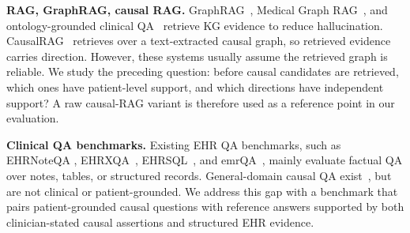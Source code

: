 \documentclass[runningheads]{llncs}
\begin{document}
\noindent\textbf{RAG, GraphRAG, causal RAG.} GraphRAG~\cite{edge2024graphrag}, Medical Graph RAG~\cite{medgraphrag2024}, and ontology-grounded clinical QA~\cite{llmkg2024biomed} retrieve KG evidence to reduce hallucination. CausalRAG~\cite{wang2025causalrag} retrieves over a text-extracted causal graph, so retrieved evidence carries direction. However, these systems usually assume the retrieved graph is reliable. We study the preceding question: before causal candidates are retrieved, which ones have patient-level support, and which directions have independent support? A raw causal-RAG variant is therefore used as a reference point in our evaluation. %

\noindent\textbf{Clinical QA benchmarks.} Existing EHR QA benchmarks, such as EHRNoteQA \cite{kweon2024ehrnoteqa}, EHRXQA~\cite{ehrxqa2023}, EHRSQL~\cite{lee2022ehrsql}, and emrQA~\cite{pampari2018emrqa}, mainly evaluate factual QA over notes, tables, or structured records. General-domain causal QA exist~\cite{yang2022causalreasoning}, but are not clinical or patient-grounded. We address this gap with a benchmark that pairs patient-grounded causal questions with reference answers supported by both clinician-stated causal assertions and structured EHR evidence.%
\end{document}
